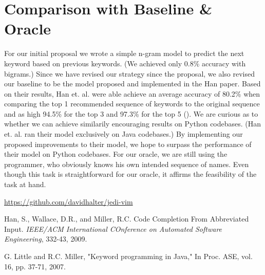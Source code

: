 \documentclass[10pt]{article}
\begin{document}
\section{Comparison with Baseline \& Oracle}
For our initial proposal we wrote a simple n-gram model to predict the next keyword based on previous keywords. (We achieved only $0.8\%$ accuracy with bigrams.) Since we have revised our strategy since the proposal, we also revised our baseline to be the model proposed and implemented in the Han paper. Based on their results, Han et. al. were able achieve an average accuracy of 80.2\% when comparing the top 1 recommended sequence of keywords to the original sequence and as high 94.5\% for the top 3 and 97.3\% for the top 5 (\cite{han}). We are curious as to whether we can achieve similarily encouraging results on Python codebases. (Han et. al. ran their model exclusively on Java codebases.) By implementing our proposed improvements to their model, we hope to surpass the performance of their model on Python codebases. For our oracle, we are still using the programmer, who obviously knows his own intended sequence of names. Even though this task is straightforward for our oracle, it affirms the feasibility of the task at hand.
\begin{thebibliography}{9}

 \url{https://github.com/davidhalter/jedi-vim}

 Han, S., Wallace, D.R., and Miller, R.C. Code Completion From Abbreviated Input. \emph{IEEE/ACM International COnference on Automated Software Engineering}, 332-43, 2009.

 G. Little and R.C. Miller, "Keyword programming in Java," In Proc. ASE, vol. 16, pp. 37-71, 2007.

\end{thebibliography}
\end{document}
